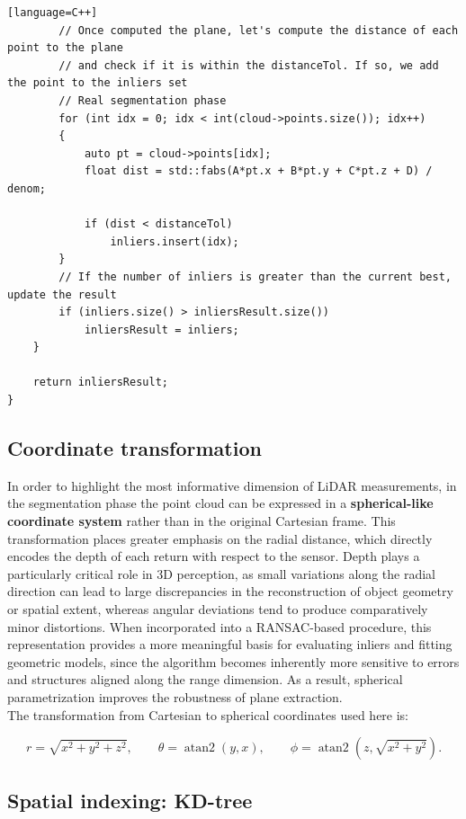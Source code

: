 \begin{lstlisting}[basicstyle=\ttfamily\scriptsize][language=C++]
        // Once computed the plane, let's compute the distance of each point to the plane
        // and check if it is within the distanceTol. If so, we add the point to the inliers set
        // Real segmentation phase
        for (int idx = 0; idx < int(cloud->points.size()); idx++)
        {
            auto pt = cloud->points[idx];
            float dist = std::fabs(A*pt.x + B*pt.y + C*pt.z + D) / denom;

            if (dist < distanceTol)
                inliers.insert(idx);
        }
        // If the number of inliers is greater than the current best, update the result
        if (inliers.size() > inliersResult.size())
            inliersResult = inliers;
    }

    return inliersResult;
}
\end{lstlisting}

\subsection{Coordinate transformation}

In order to highlight the most informative dimension of LiDAR measurements, in the segmentation phase the point cloud can be expressed in a \textbf{spherical-like coordinate system} rather than in the original Cartesian frame. 
This transformation places greater emphasis on the radial distance, which directly encodes the depth of each return with respect to the sensor. 
Depth plays a particularly critical role in 3D perception, as small variations along the radial direction can lead to large discrepancies in the reconstruction of object geometry or spatial extent, whereas angular deviations tend to produce comparatively minor distortions. 
When incorporated into a RANSAC-based procedure, this representation provides a more meaningful basis for evaluating inliers and fitting geometric models, since the algorithm becomes inherently more sensitive to errors and structures aligned along the range dimension. 
As a result, spherical parametrization improves the robustness of plane extraction. \\
The transformation from Cartesian to spherical coordinates used here is:

$$
r = \sqrt{x^2 + y^2 + z^2}, \qquad
\theta = \operatorname{atan2}(y,x), \qquad
\phi = \operatorname{atan2}\left(z,\sqrt{x^2+y^2}\right).
$$


\subsection{Spatial indexing: KD-tree}

